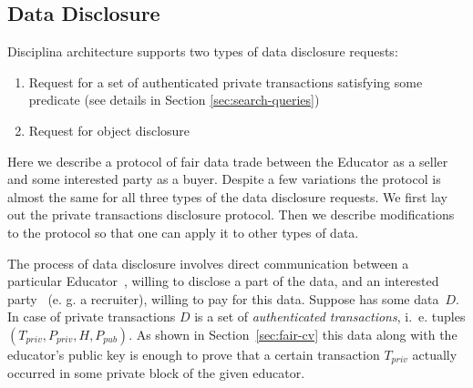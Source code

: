 \subsection{Data Disclosure}
\label{sec:DataDisclosure}

Disciplina architecture supports two types of data disclosure requests:
\begin{enumerate}
  \item Request for a set of authenticated private transactions satisfying some predicate (see details in Section \ref{sec:search-queries})
  \item Request for object disclosure
\end{enumerate}

Here we describe a protocol of fair data trade between the Educator as a seller and some interested party as a buyer. Despite a few variations the protocol is almost the same for all three types of the data disclosure requests. We first lay out the private transactions disclosure protocol. Then we describe modifications to the protocol so that one can apply it to other types of data.

The process of data disclosure involves direct communication between a particular Educator~, willing to disclose a part of the data, and an interested party~ (e. g. a recruiter), willing to pay for this data. Suppose  has some data~$D$. In case of private transactions $D$ is a set of \textit{authenticated transactions}, i.~e. tuples $(T_{priv}, P_{priv}, H, P_{pub})$. As shown in Section~\ref{sec:fair-cv} this data along with the educator's public key is enough to prove that a certain transaction $T_{priv}$ actually occurred in some private block of the given educator.


